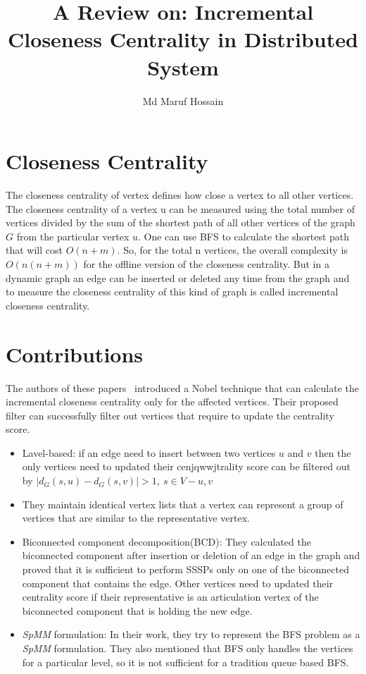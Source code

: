 \documentclass[conference, onecolumn]{IEEEtran}
\begin{document}
\title{A Review on: Incremental Closeness Centrality in Distributed System}


\author{Md Maruf Hossain}

\maketitle

\section{Closeness Centrality}
The closeness centrality of vertex defines how close a vertex to all other vertices. The closeness centrality of a vertex u 
can be measured using the total number of vertices divided by the sum of the shortest path of all other vertices of 
the graph $G$ from the particular vertex $u$. One can use BFS to calculate the shortest path that will cost $O(n+m)$. 
So, for the total n vertices, the overall complexity is $O(n(n+m))$ for the offline version of the closeness centrality. 
But in a dynamic graph an edge can be inserted or deleted any time from the graph and to measure the closeness centrality 
of this kind of graph is called incremental closeness centrality.

\section{Contributions}
The authors of these papers~\cite{sariyuce2013streamer, sariyuce2013incremental, sariyuce2015incremental} introduced a Nobel 
technique that can calculate the incremental closeness centrality only for the affected vertices. Their proposed filter 
can successfully filter out vertices that require to update the centrality score.
\begin{itemize}
\item Lavel-based: if an edge need to insert between two vertices $u$ and $v$ then 
the only vertices need to updated their cenjqwwjtrality score can be filtered out by
$|d_G(s,u) - d_G(s,v)|>1,\ s\in V-{u,v}$
\item They maintain identical vertex lists that a vertex can represent a group of vertices 
that are similar to the representative vertex.
\item Biconnected component decomposition(BCD): They calculated the biconnected component after insertion 
or deletion of an edge in the graph and proved that it is sufficient to perform SSSPs only on one 
of the biconnected component that contains the edge. Other vertices need to updated their centrality 
score if their representative is an articulation vertex of the biconnected component that is holding 
the new edge. 
\item \textit{SpMM} formulation: In their work, they try to represent the BFS problem as a 
\textit{SpMM} formulation. They also mentioned that BFS only handles the vertices for a particular level, so it is 
not sufficient for a tradition queue based BFS.
\end{itemize}



\end{document}
